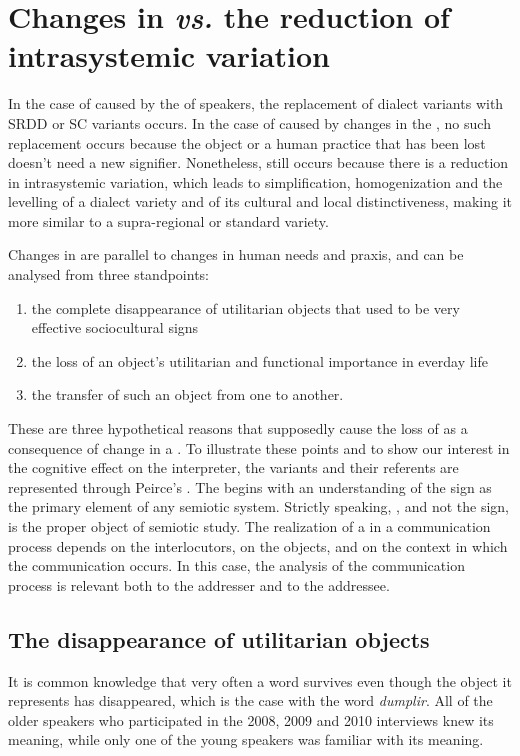 \documentclass[output=paper]{LSP/langsci}
\begin{document}
\section{Changes in  \textit{vs.} the reduction of intrasystemic variation}
In the case of  caused by the  of speakers, the replacement of dialect variants with SRDD or SC variants occurs. In the case of  caused by changes in the , no such replacement occurs because the object or a human practice that has been lost doesn’t need a new signifier. Nonetheless,  still occurs because there is a reduction in intrasystemic variation, which leads to simplification, homogenization and the levelling of a dialect variety and of its cultural and local distinctiveness, making it more similar to a supra-regional or standard variety.

Changes in  are parallel to changes in human needs and praxis, and can be analysed from three standpoints: 

\begin{enumerate}
\item the complete disappearance of utilitarian objects that used to be very effective sociocultural signs 
\item the loss of an object's utilitarian and functional importance in everday life
\item the transfer of such an object from one  to another.
\end{enumerate}

These are three hypothetical reasons that supposedly cause the loss of  as a consequence of change in a . To illustrate these points and to show our interest in the cognitive effect on the interpreter, the variants and their referents are represented through Peirce's . The  begins with an understanding of the sign as the primary element of any semiotic system. Strictly speaking, , and not the sign, is the proper object of semiotic study. The realization of a  in a communication process depends on the interlocutors, on the objects, and on the context in which the communication occurs. In this case, the analysis of the communication process is relevant both to the addresser and to the addressee. 

\subsection{The disappearance of utilitarian objects}
It is common knowledge that very often a word survives even though the object it represents has disappeared, which is the case with the word \textit{dumplir}. All of the older speakers who participated in the 2008, 2009 and 2010 interviews knew its meaning, while only one of the young speakers was familiar with its meaning.
\end{document}
